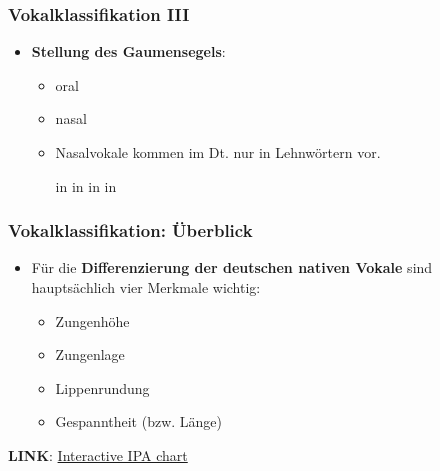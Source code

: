 \begin{frame}
\frametitle{Vokalklassifikation III}

	\begin{itemize}
	
		
		
		\item \textbf{Stellung des Gaumensegels}:
		
		\begin{itemize}
			\item oral
			\item nasal
			
			\item Nasalvokale kommen im Dt. nur in Lehnwörtern vor.

			\eal
			\ex \textipa{[ \~a ]} in 
			\ex \textipa{[ \~E ]} in 
			\ex \textipa{[ \~o ]} in 
			\ex \textipa{[ \~\oe\ ]} in 
			\zl
		
		\end{itemize}
		
	\end{itemize}
	
\end{frame}


\begin{frame}
\frametitle{Vokalklassifikation: Überblick}

	\begin{itemize}
		\item Für die \textbf{Differenzierung der deutschen nativen Vokale} sind hauptsächlich vier Merkmale wichtig:
		
		\begin{itemize}
			
			\item Zungenhöhe
			
			\item Zungenlage
			
			\item Lippenrundung
			
			\item Gespanntheit (bzw. Länge)
		\end{itemize}
		
	\end{itemize}

\textbf{LINK}: \href{http://www.ipachart.com/}{Interactive IPA chart}
	
\end{frame}


